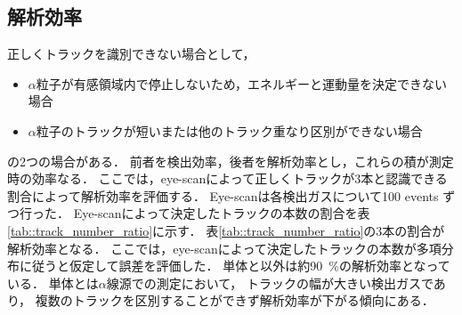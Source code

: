 \documentclass[../master]{subfiles}
\begin{document}
\subsection{解析効率}
正しくトラックを識別できない場合として，
\begin{itemize}
\item 
  $\alpha$粒子が有感領域内で停止しないため，エネルギーと運動量を決定できない場合
\item
  $\alpha$粒子のトラックが短いまたは他のトラック重なり区別ができない場合
\end{itemize}
の2つの場合がある．
前者を検出効率，後者を解析効率とし，これらの積が測定時の効率なる．
ここでは，eye-scanによって正しくトラックが3本と認識できる割合によって解析効率を評価する．
Eye-scanは各検出ガスについて100 events ずつ行った．
Eye-scanによって決定したトラックの本数の割合を表\ref{tab::track_number_ratio}に示す．
表\ref{tab::track_number_ratio}の3本の割合が解析効率となる．
ここでは，eye-scanによって決定したトラックの本数が多項分布に従うと仮定して誤差を評価した．
\Methane 単体と\MethaneHerium 以外は約\SI{90}{\percent}の解析効率となっている．
\Methane 単体と\MethaneHerium は$\alpha$線源での測定において，
トラックの幅が大きい検出ガスであり，
複数のトラックを区別することができず解析効率が下がる傾向にある．
\end{document}
